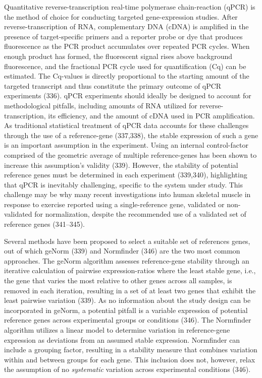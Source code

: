 \documentclass[twoside,10pt]{gihclass} %
\begin{document}
Quantitative reverse-transcription real-time polymerase chain-reaction (qPCR) is the method of choice for conducting targeted gene-expression studies.
After reverse-transcription of RNA, complementary DNA (cDNA) is amplified in the presence of target-specific primers and a reporter probe or dye that produces fluorescence as the PCR product accumulates over repeated PCR cycles. When enough product has formed, the fluorescent signal rises above background fluorescence, and the fractional PCR cycle used for quantification (Cq) can be estimated. The Cq-values is directly proportional to the starting amount of the targeted transcript and thus constitute the primary outcome of qPCR experiments
(336).
qPCR experiments should ideally be designed to account for methodological pitfalls, including amounts of RNA utilized for reverse-transcription, its efficiency, and the amount of cDNA used in PCR amplification.
As traditional statistical treatment of qPCR data accounts for these challenges through the use of a reference-gene (337,338), the stable expression of such a gene is an important assumption in the experiment.
Using an internal control-factor comprised of the geometric average of multiple reference-genes has been shown to increase this assumption's validity (339).
However, the stability of potential reference genes must be determined in each experiment (339,340), highlighting that qPCR is inevitably challenging, specific to the system under study.
This challenge may be why many recent investigations into human skeletal muscle in response to exercise reported using a single-reference gene, validated or non-validated for normalization, despite the recommended use of a validated set of reference genes (341--345).

Several methods have been proposed to select a suitable set of references genes, out of which geNorm (339) and Normfinder (346) are the two most common approaches.
The geNorm algorithm assesses reference-gene stability through an iterative calculation of pairwise expression-ratios where the least stable gene, i.e., the gene that varies the most relative to other genes across all samples, is removed in each iteration, resulting in a set of at least two genes that exhibit the least pairwise variation (339).
As no information about the study design can be incorporated in geNorm, a potential pitfall is a variable expression of potential reference genes across experimental groups or conditions (346).
The Normfinder algorithm utilizes a linear model to determine variation in reference-gene expression as deviations from an assumed stable expression.
Normfinder can include a grouping factor, resulting in a stability measure that combines variation within and between groups for each gene.
This inclusion does not, however, relax the assumption of no \emph{systematic} variation across experimental conditions (346).
\end{document}
